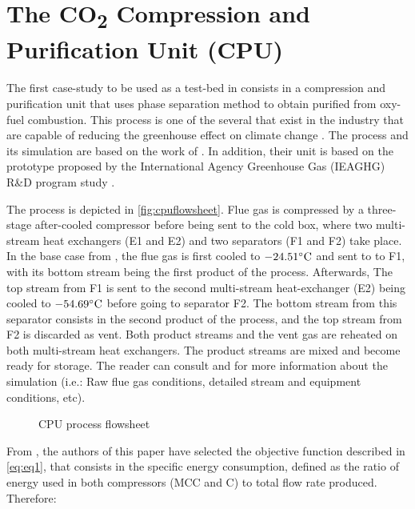 \documentclass[../../msc-thesis.tex]{subfiles}
\begin{document}
\section{The CO\texorpdfstring{\textsubscript{2}}{\space} Compression and 
Purification Unit (CPU)}

The first case-study to be used as a test-bed in \mtc consists in a 
\co compression and purification unit that uses phase 
separation method to obtain purified \co from oxy-fuel 
combustion. This process is one of the several that exist in the industry 
that are capable of reducing the greenhouse effect on climate 
change \cite{Jin2015}. The process and its simulation are based on the work 
of \textcite{Liu2019}. In addition, their unit is based on the prototype 
proposed by the International Agency Greenhouse Gas (IEAGHG) R{\&}D 
program study \cite{Dillon2005}.

The process is depicted in \autoref{fig:cpuflowsheet}. Flue gas is compressed 
by a three-stage after-cooled compressor before being sent to the cold 
box, where two multi-stream heat exchangers (E1 and E2) and two separators 
(F1 and F2) take place. In the base case from \textcite{Liu2019}, the flue gas 
is first cooled to $-24.51\celsius$ and sent to to F1, with its bottom 
stream being the first product of the process. Afterwards, The top stream 
from F1 is sent to the second multi-stream heat-exchanger (E2) being cooled 
to $-54.69\celsius$ before going to separator F2. The bottom stream 
from this separator consists in the second product of the process, and the 
top stream from F2 is discarded as vent. Both \co product streams and the 
vent gas are reheated on both multi-stream heat exchangers. The \co product 
streams are mixed and become ready for storage. The reader can consult 
\textcite{Jin2015} and \textcite{Liu2019} for more information about the 
simulation (i.e.: Raw flue gas conditions, detailed stream and equipment 
conditions, etc).

\begin{figure}[htb]
    \caption{CPU process flowsheet}
    \centering
    \label{fig:cpuflowsheet}
\end{figure}

From \textcite{Liu2019}, the authors of this paper have selected the objective 
function described in \autoref{eq:eq1}, that consists in the specific energy 
consumption, defined as the ratio of energy used in both compressors 
(MCC and C) to total \co flow rate produced. Therefore:
\end{document}
